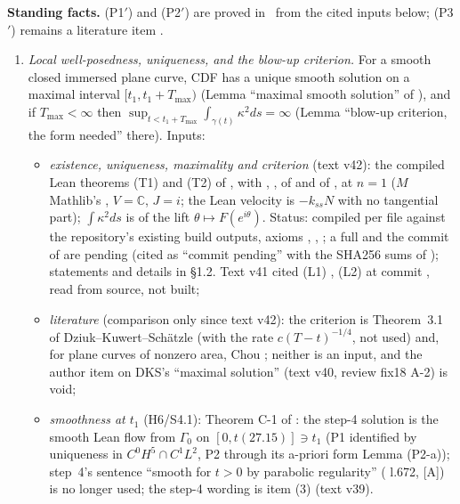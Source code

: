 \documentclass[11pt]{article}
\begin{document}
\noindent\textbf{Standing facts.} (P1$'$) and (P2$'$) are proved in  \tH\ from the cited inputs below; (P3$'$) remains a literature item \tH.
\begin{enumerate}[label=(P\arabic*$'$),leftmargin=3em]
\item \emph{Local well-posedness, uniqueness, and the blow-up criterion.} For a smooth closed immersed plane curve, CDF has a unique smooth solution on a maximal interval $[t_1,t_1+T_{\max})$ (Lemma ``maximal smooth solution'' of ), and if $T_{\max}<\infty$ then $\sup_{t<t_1+T_{\max}}\int_{\gamma(t)}\kappa^2ds=\infty$ (Lemma ``blow-up criterion, the form needed'' there). Inputs:
  \begin{itemize}[leftmargin=*]
  \item \emph{existence, uniqueness, maximality and criterion} (text v42): the compiled Lean theorems  (T1) and  (T2) of , with , ,  of  and  of  \cite{CWFlow}, at $n=1$ ($M$ Mathlib's , $V=\mathbb C$, $J=i$; the Lean velocity is $-k_{ss}N$ with no tangential part); $\int\kappa^2ds$ is  of the lift $\theta\mapsto F(e^{i\theta})$. Status: compiled per file against the repository's existing build outputs, axioms , , ; a full  and the commit of  are pending (cited as ``commit pending'' with the SHA256 sums of ); statements and details in  \S1.2. Text v41 cited (L1) , (L2)  at commit , read from source, not built;
  \item \emph{literature} (comparison only since text v42): the criterion is Theorem~3.1 of Dziuk--Kuwert--Sch\"atzle \cite{DKS2002} (with the rate $c(T-t)^{-1/4}$, not used) and, for plane curves of nonzero area, Chou \cite{Chou2003}; neither is an input, and the author item on DKS's ``maximal solution'' (text v40, review fix18 A-2) is void;
  \item \emph{smoothness at $t_1$} (H6/S4.1): Theorem C-1 of  \tHd: the step-4 solution is the smooth Lean flow from $\Gamma_0$ on $[0,t(27.15)]\ni t_1$ (P1 identified by uniqueness in $C^0H^5\cap C^1L^2$, P2 through its a-priori form Lemma (P2-a)); step~4's sentence ``smooth for $t>0$ by parabolic regularity'' ( l.672, [A]) is no longer used; the step-4 wording is  item (3) (text v39).

\end{itemize}
\end{enumerate}
\end{document}
